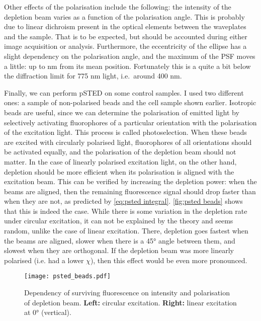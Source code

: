 Other effects of the polarisation include the following: the intensity of the depletion beam varies as a function of the polarisation angle. This is probably due to linear dichroism present in the optical elements between the waveplates and the sample. That is to be expected, but should be accounted during either image acquisition or analysis. Furthermore, the eccentricity of the ellipse has a slight dependency on the polarisation angle, and the maximum of the PSF moves a little: up to  nm from its mean position. Fortunately this is a quite a bit below the diffraction limit for 775 nm light, i.e.~around 400 nm. 


Finally, we can perform pSTED on some control samples. I used two different ones: a sample of non-polarised beads and the cell sample shown earlier. Isotropic beads are useful, since we can determine the polarisation of emitted light by selectively activating fluorophores of a particular orientation with the polarisation of the excitation light. This process is called photoselection. When these beads are excited with circularly polarised light, fluorophores of all orientations should be activated equally, and the polarisation of the depletion beam should not matter. In the case of linearly polarised excitation light, on the other hand, depletion should be more efficient when its polarisation is aligned with the excitation beam. This can be verified by increasing the depletion power: when the beams are aligned, then the remaining fluorescence signal should drop faster than when they are not, as predicted by \autoref{eq:psted integral}. \autoref{fig:psted beads} shows that this is indeed the case. While there is some variation in the depletion rate under circular excitation, it can not be explained by the theory and seems random, unlike the case of linear excitation. There, depletion goes fastest when the beams are aligned, slower when there is a 45° angle between them, and slowest when they are orthogonal. If the depletion beam was more linearly polarised (i.e. had a lower $ \chi $), then this effect would be even more pronounced.

\begin{figure}
	\centering
	\texttt{[image: psted\_beads.pdf]}
	\caption{
		Dependency of surviving fluorescence on intensity and polarisation of depletion beam. \textbf{Left:} circular excitation. \textbf{Right:} linear excitation at 0° (vertical).
	}
	\label{fig:psted beads}
\end{figure}

